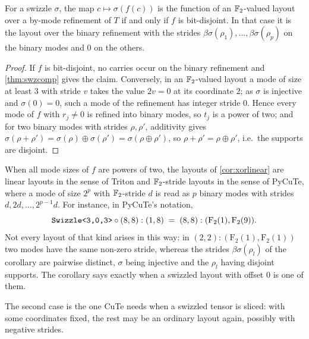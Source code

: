 \begin{corollary}\label{cor:xorlinear}
For a swizzle $\sigma$, the map $c\mapsto\sigma(f(c))$ is the function of an $\mathbb{F}_2$-valued
layout over a by-mode refinement of $T$ if and only if $f$ is bit-disjoint. In that case it is the
layout over the binary refinement with the strides $\beta\sigma(\rho_1),\dots,\beta\sigma(\rho_p)$
on the binary modes and $0$ on the others.
\end{corollary}
\begin{proof}
If $f$ is bit-disjoint, no carries occur on the binary refinement and \cref{thm:swzcomp} gives
the claim. Conversely, in an $\mathbb{F}_2$-valued layout a mode of size at least $3$ with stride $v$
takes the value $2v=0$ at its coordinate $2$; as $\sigma$ is injective and $\sigma(0)=0$, such a
mode of the refinement has integer stride $0$. Hence every mode of $f$ with $r_j\neq0$ is refined
into binary modes, so $t_j$ is a power of two; and for two binary modes with strides
$\rho,\rho'$, additivity gives $\sigma(\rho+\rho')=\sigma(\rho)\oplus\sigma(\rho')=\sigma(\rho\oplus\rho')$,
so $\rho+\rho'=\rho\oplus\rho'$, i.e.\ the supports are disjoint.
\end{proof}

\noindent When all mode sizes of $f$ are powers of two, the layouts of \cref{cor:xorlinear} are
linear layouts in the sense of Triton and $\mathbb{F}_2$-stride layouts in the sense of PyCuTe, where a
mode of size $2^p$ with $\mathbb{F}_2$-stride $d$ is read as $p$ binary modes with strides
$d,2d,\dots,2^{p-1}d$. For instance, in PyCuTe's notation,
\[ \text{\texttt{Swizzle<3,0,3>}}\circ(8,8):(1,8)\;=\;(8,8):(\mathrm F_2(1),\mathrm F_2(9)). \]
Not every layout of that kind arises in this way: in $(2,2):(\mathrm F_2(1),\mathrm F_2(1))$ two
modes have the same non-zero stride, whereas the strides $\beta\sigma(\rho_l)$ of the corollary
are pairwise distinct, $\sigma$ being injective and the $\rho_l$ having disjoint supports. The
corollary says exactly when a swizzled layout with offset $0$ is one of them.

The second case is the one CuTe needs when a swizzled tensor is sliced: with some coordinates
fixed, the rest may be an ordinary layout again, possibly with negative strides.

